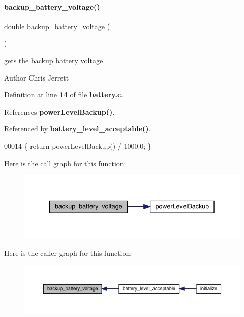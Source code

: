 \paragraph{backup\+\_\+battery\+\_\+voltage()}
{\footnotesize\ttfamily double backup\+\_\+battery\+\_\+voltage (\begin{DoxyParamCaption}{ }\end{DoxyParamCaption})}



gets the backup battery voltage 

\begin{DoxyAuthor}{Author}
Chris Jerrett 
\end{DoxyAuthor}


Definition at line \textbf{ 14} of file \textbf{ battery.\+c}.



References \textbf{ power\+Level\+Backup()}.



Referenced by \textbf{ battery\+\_\+level\+\_\+acceptable()}.


\begin{DoxyCode}
00014 \{ \textcolor{keywordflow}{return} powerLevelBackup() / 1000.0; \}
\end{DoxyCode}
Here is the call graph for this function\+:
\nopagebreak
\begin{figure}[H]
\begin{center}
\leavevmode
\includegraphics[width=339pt]{battery_8h_a9b1c5cf7ddddebf63796050a1d4a9969_cgraph}
\end{center}
\end{figure}
Here is the caller graph for this function\+:
\nopagebreak
\begin{figure}[H]
\begin{center}
\leavevmode
\includegraphics[width=350pt]{battery_8h_a9b1c5cf7ddddebf63796050a1d4a9969_icgraph}
\end{center}
\end{figure}
\mbox{\label{battery_8h_a1097bbb878f6e2690f8eea6cd231959a}} 
